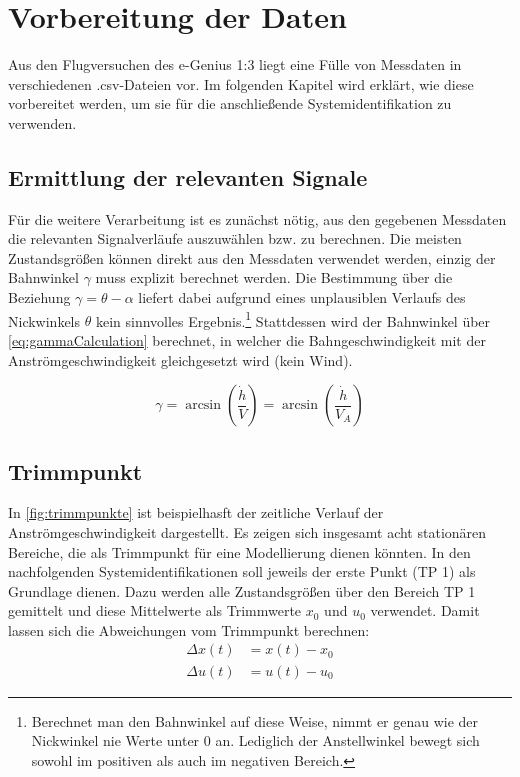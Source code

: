 \chapter{Vorbereitung der Daten}
Aus den Flugversuchen des e-Genius 1:3 liegt eine Fülle von Messdaten in verschiedenen .csv-Dateien vor. Im folgenden Kapitel 
wird erklärt, wie diese vorbereitet werden, um sie für die anschließende Systemidentifikation zu verwenden.



\section{Ermittlung der relevanten Signale} %
Für die weitere Verarbeitung ist es zunächst nötig, aus den gegebenen Messdaten die relevanten Signalverläufe auszuwählen 
bzw. zu berechnen. Die meisten Zustandsgrößen können direkt aus den Messdaten verwendet werden, einzig der Bahnwinkel $ 
\gamma $ muss explizit berechnet werden. Die Bestimmung über die Beziehung $ \gamma=\theta-\alpha $ liefert dabei aufgrund 
eines unplausiblen Verlaufs des Nickwinkels $ \theta $ kein sinnvolles Ergebnis.\footnote{Berechnet man den Bahnwinkel auf 
diese Weise, nimmt er genau wie der Nickwinkel nie Werte unter 0 an. Lediglich der Anstellwinkel bewegt sich sowohl im 
positiven als auch im negativen Bereich.} Stattdessen wird der Bahnwinkel über \cref{eq:gammaCalculation} berechnet, in 
welcher die Bahngeschwindigkeit mit der Anströmgeschwindigkeit gleichgesetzt wird (kein Wind).

\begin{equation}
	\gamma = \arcsin{\left( \frac{\dot h}{V} \right)} = \arcsin{\left( \frac{\dot h}{V_A} \right)}
	\label{eq:gammaCalculation}
\end{equation}



\section{Trimmpunkt} %
In \cref{fig:trimmpunkte} ist beispielhasft der zeitliche Verlauf der Anströmgeschwindigkeit dargestellt. Es zeigen sich 
insgesamt acht stationären Bereiche, die als Trimmpunkt für eine Modellierung dienen könnten. In den nachfolgenden 
Systemidentifikationen soll jeweils der erste Punkt (TP 1) als Grundlage dienen. Dazu werden alle Zustandsgrößen über den 
Bereich TP 1 gemittelt und diese Mittelwerte als Trimmwerte $ x_0 $ und $ u_0 $ verwendet. Damit lassen sich die Abweichungen 
vom Trimmpunkt berechnen:
\begin{equation}
	\begin{split}
		\Delta x(t) &= x(t)-x_0\\
		\Delta u(t) &= u(t)-u_0
	\end{split}
\end{equation}

